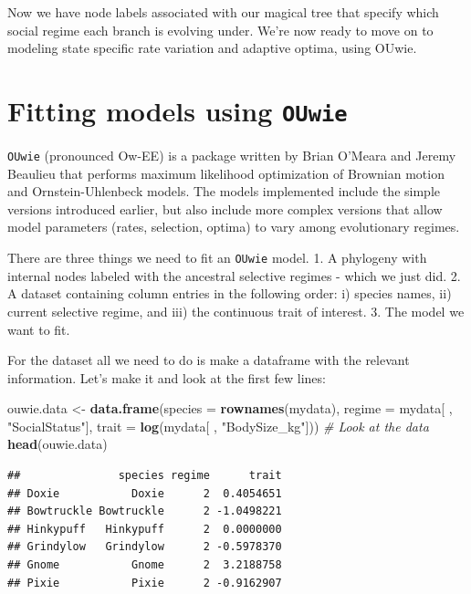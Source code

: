 \documentclass[]{book}
\newenvironment{Shaded}{\begin{snugshade}}{\end{snugshade}}
\newcommand{\KeywordTok}[1]{\textcolor[rgb]{0.13,0.29,0.53}{\textbf{{#1}}}}
\newcommand{\DataTypeTok}[1]{\textcolor[rgb]{0.13,0.29,0.53}{{#1}}}
\newcommand{\StringTok}[1]{\textcolor[rgb]{0.31,0.60,0.02}{{#1}}}
\newcommand{\CommentTok}[1]{\textcolor[rgb]{0.56,0.35,0.01}{\textit{{#1}}}}
\newcommand{\NormalTok}[1]{{#1}}
\theoremstyle{definition}
\theoremstyle{definition}
\theoremstyle{definition}
\theoremstyle{remark}
\begin{document}
Now we have node labels associated with our magical tree that specify
which social regime each branch is evolving under. We're now ready to
move on to modeling state specific rate variation and adaptive optima,
using OUwie.

\section{\texorpdfstring{Fitting models using
\texttt{OUwie}}{Fitting models using OUwie}}\label{fitting-models-using-ouwie}

\texttt{OUwie} (pronounced Ow-EE) is a package written by Brian O'Meara
and Jeremy Beaulieu that performs maximum likelihood optimization of
Brownian motion and Ornstein-Uhlenbeck models. The models implemented
include the simple versions introduced earlier, but also include more
complex versions that allow model parameters (rates, selection, optima)
to vary among evolutionary regimes.

There are three things we need to fit an \texttt{OUwie} model. 1. A
phylogeny with internal nodes labeled with the ancestral selective
regimes - which we just did. 2. A dataset containing column entries in
the following order: i) species names, ii) current selective regime, and
iii) the continuous trait of interest. 3. The model we want to fit.

For the dataset all we need to do is make a dataframe with the relevant
information. Let's make it and look at the first few lines:

\begin{Shaded}
\begin{Highlighting}[]
\NormalTok{ouwie.data <-}\StringTok{ }\KeywordTok{data.frame}\NormalTok{(}\DataTypeTok{species =} \KeywordTok{rownames}\NormalTok{(mydata), }\DataTypeTok{regime =} \NormalTok{mydata[ , }\StringTok{"SocialStatus"}\NormalTok{],}
\DataTypeTok{trait =} \KeywordTok{log}\NormalTok{(mydata[ , }\StringTok{"BodySize_kg"}\NormalTok{]))}
\CommentTok{# Look at the data}
\KeywordTok{head}\NormalTok{(ouwie.data)}
\end{Highlighting}
\end{Shaded}

\begin{verbatim}
##               species regime      trait
## Doxie           Doxie      2  0.4054651
## Bowtruckle Bowtruckle      2 -1.0498221
## Hinkypuff   Hinkypuff      2  0.0000000
## Grindylow   Grindylow      2 -0.5978370
## Gnome           Gnome      2  3.2188758
## Pixie           Pixie      2 -0.9162907
\end{verbatim}
\end{document}
